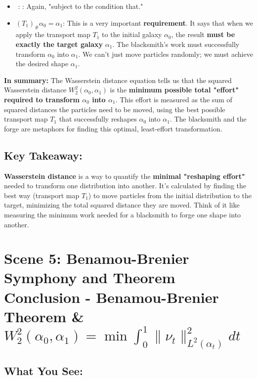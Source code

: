 \documentclass{article}
\begin{document}
\begin{itemize}
\begin{itemize}
        \end{itemize}
    \item \textbf{\( \text{ : } \)}: Again, "subject to the condition that."
    \item \textbf{\( (T_1)_\# \alpha_0 = \alpha_1 \)}:  This is a very important \textbf{requirement}. It says that when we apply the transport map \( T_1 \) to the initial galaxy \( \alpha_0 \), the result \textbf{must be exactly the target galaxy} \( \alpha_1 \).  The blacksmith's work must successfully transform \( \alpha_0 \) into \( \alpha_1 \).  We can't just move particles randomly; we must achieve the desired shape \( \alpha_1 \).
\end{itemize}


\textbf{In summary:}  The Wasserstein distance equation tells us that the squared Wasserstein distance \( W_2^2(\alpha_0, \alpha_1) \) is the \textbf{minimum possible total "effort" required to transform \( \alpha_0 \) into \( \alpha_1 \)}.  This effort is measured as the sum of squared distances the particles need to be moved, using the best possible transport map \( T_1 \) that successfully reshapes \( \alpha_0 \) into \( \alpha_1 \). The blacksmith and the forge are metaphors for finding this optimal, least-effort transformation.

\subsection*{Key Takeaway:}

\textbf{Wasserstein distance} is a way to quantify the \textbf{minimal "reshaping effort"} needed to transform one distribution into another. It's calculated by finding the best way (transport map \( T_1 \)) to move particles from the initial distribution to the target, minimizing the total squared distance they are moved.  Think of it like measuring the minimum work needed for a blacksmith to forge one shape into another.

\hrulefill

\section*{Scene 5: Benamou-Brenier Symphony and Theorem Conclusion -  Benamou-Brenier Theorem \&  \( W_2^2(\alpha_0, \alpha_1) = \min \int_0^1 \|\nu_t\|_{L^2(\alpha_t)}^2 dt \)}

\subsection*{What You See:}
\end{document}
